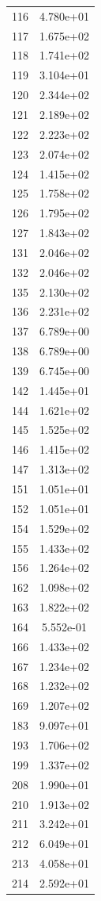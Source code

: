 \documentclass[12pt]{article}
\begin{document}
\begin{longtable}{@{}cc@{}}
116 & 4.780e+01 \\
117 & 1.675e+02 \\
118 & 1.741e+02 \\
119 & 3.104e+01 \\
120 & 2.344e+02 \\
121 & 2.189e+02 \\
122 & 2.223e+02 \\
123 & 2.074e+02 \\
124 & 1.415e+02 \\
125 & 1.758e+02 \\
126 & 1.795e+02 \\
127 & 1.843e+02 \\
131 & 2.046e+02 \\
132 & 2.046e+02 \\
135 & 2.130e+02 \\
136 & 2.231e+02 \\
137 & 6.789e+00 \\
138 & 6.789e+00 \\
139 & 6.745e+00 \\
142 & 1.445e+01 \\
144 & 1.621e+02 \\
145 & 1.525e+02 \\
146 & 1.415e+02 \\
147 & 1.313e+02 \\
151 & 1.051e+01 \\
152 & 1.051e+01 \\
154 & 1.529e+02 \\
155 & 1.433e+02 \\
156 & 1.264e+02 \\
162 & 1.098e+02 \\
163 & 1.822e+02 \\
164 & 5.552e-01 \\
166 & 1.433e+02 \\
167 & 1.234e+02 \\
168 & 1.232e+02 \\
169 & 1.207e+02 \\
183 & 9.097e+01 \\
193 & 1.706e+02 \\
199 & 1.337e+02 \\
208 & 1.990e+01 \\
210 & 1.913e+02 \\
211 & 3.242e+01 \\
212 & 6.049e+01 \\
213 & 4.058e+01 \\
214 & 2.592e+01 \\

\end{longtable}
\end{document}
